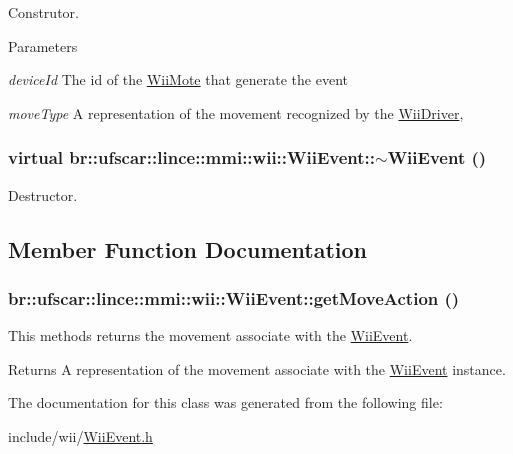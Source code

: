 Construtor. 


\begin{DoxyParams}{Parameters}
\item[{\em deviceId}]The id of the \hyperlink{classbr_1_1ufscar_1_1lince_1_1mmi_1_1wii_1_1WiiMote}{WiiMote} that generate the event \item[{\em moveType}]A representation of the movement recognized by the \hyperlink{classbr_1_1ufscar_1_1lince_1_1mmi_1_1wii_1_1WiiDriver}{WiiDriver}, \end{DoxyParams}
\hypertarget{classbr_1_1ufscar_1_1lince_1_1mmi_1_1wii_1_1WiiEvent_ace3a3623e886671767522e4c7d28e2bb}{
\subsubsection[{$\sim$WiiEvent}]{\setlength{\rightskip}{0pt plus 5cm}virtual br::ufscar::lince::mmi::wii::WiiEvent::$\sim$WiiEvent ()}}
\label{classbr_1_1ufscar_1_1lince_1_1mmi_1_1wii_1_1WiiEvent_ace3a3623e886671767522e4c7d28e2bb}


Destructor. 



\subsection{Member Function Documentation}
\hypertarget{classbr_1_1ufscar_1_1lince_1_1mmi_1_1wii_1_1WiiEvent_a1bd7fdbcc56be18c294108041f8d65ee}{
\subsubsection[{getMoveAction}]{ br::ufscar::lince::mmi::wii::WiiEvent::getMoveAction ()}}
\label{classbr_1_1ufscar_1_1lince_1_1mmi_1_1wii_1_1WiiEvent_a1bd7fdbcc56be18c294108041f8d65ee}


This methods returns the movement associate with the \hyperlink{classbr_1_1ufscar_1_1lince_1_1mmi_1_1wii_1_1WiiEvent}{WiiEvent}. 

\begin{DoxyReturn}{Returns}
A representation of the movement associate with the \hyperlink{classbr_1_1ufscar_1_1lince_1_1mmi_1_1wii_1_1WiiEvent}{WiiEvent} instance. 
\end{DoxyReturn}


The documentation for this class was generated from the following file:\begin{DoxyCompactItemize}
\item 
include/wii/\hyperlink{WiiEvent_8h}{WiiEvent.h}\end{DoxyCompactItemize}

